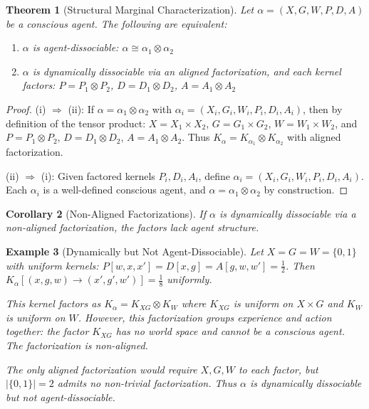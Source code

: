 \documentclass[11pt,a4paper]{article}
\newtheorem{theorem}{Theorem}[section]
\newtheorem{corollary}[theorem]{Corollary}
\newtheorem{example}[theorem]{Example}
\begin{document}
\begin{theorem}[Structural Marginal Characterization]\label{thm:marginal}
Let $\alpha = (X, G, W, P, D, A)$ be a conscious agent. The following are equivalent:
\begin{enumerate}[nosep]
    \item[(i)] $\alpha$ is agent-dissociable: $\alpha \cong \alpha_1 \otimes \alpha_2$
    \item[(ii)] $\alpha$ is dynamically dissociable via an aligned factorization, and each kernel factors: $P = P_1 \otimes P_2$, $D = D_1 \otimes D_2$, $A = A_1 \otimes A_2$
\end{enumerate}
\end{theorem}

\begin{proof}
(i) $\Rightarrow$ (ii): If $\alpha = \alpha_1 \otimes \alpha_2$ with $\alpha_i = (X_i, G_i, W_i, P_i, D_i, A_i)$, then by definition of the tensor product: $X = X_1 \times X_2$, $G = G_1 \times G_2$, $W = W_1 \times W_2$, and $P = P_1 \otimes P_2$, $D = D_1 \otimes D_2$, $A = A_1 \otimes A_2$. Thus $K_\alpha = K_{\alpha_1} \otimes K_{\alpha_2}$ with aligned factorization.

(ii) $\Rightarrow$ (i): Given factored kernels $P_i, D_i, A_i$, define $\alpha_i = (X_i, G_i, W_i, P_i, D_i, A_i)$. Each $\alpha_i$ is a well-defined conscious agent, and $\alpha = \alpha_1 \otimes \alpha_2$ by construction.
\end{proof}

\begin{corollary}[Non-Aligned Factorizations]\label{cor:nonaligned}
If $\alpha$ is dynamically dissociable via a non-aligned factorization, the factors lack agent structure.
\end{corollary}

\begin{example}[Dynamically but Not Agent-Dissociable]\label{ex:dyn-not-agent}
Let $X = G = W = \{0,1\}$ with uniform kernels: $P[w, x, x'] = D[x, g] = A[g, w, w'] = \tfrac{1}{2}$. Then $K_\alpha[(x,g,w) \to (x',g',w')] = \tfrac{1}{8}$ uniformly.

This kernel factors as $K_\alpha = K_{XG} \otimes K_W$ where $K_{XG}$ is uniform on $X \times G$ and $K_W$ is uniform on $W$. However, this factorization groups experience and action together: the factor $K_{XG}$ has no world space and cannot be a conscious agent. The factorization is non-aligned.

The only aligned factorization would require $X, G, W$ to each factor, but $|\{0,1\}| = 2$ admits no non-trivial factorization. Thus $\alpha$ is dynamically dissociable but not agent-dissociable.
\end{example}
\end{document}
